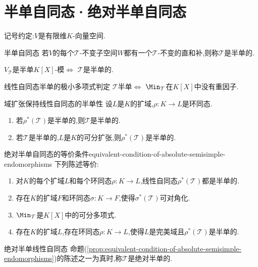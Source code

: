 \section{半单自同态·绝对半单自同态}

记号约定:$V$是有限维$K$-向量空间.

\begin{definition}{半单自同态}{}
	若$V$的每个$\mathcal{T}$-不变子空间$W$都有一个$\mathcal{T}$-不变的直和补,则称$\mathcal{T}$是半单的.
\end{definition}

\begin{remark}{}{}
	$V_{\mathcal{T}}$是半单$K[X]$-模$\iff$ $\mathcal{T}$是半单的.
\end{remark}

\begin{proposition}{线性自同态半单的极小多项式判定}{}
	$\mathcal{T}$半单$\iff$ $\Min_{\mathcal{T}}$在$K\left[X\right]$中没有重因子.
\end{proposition}

\begin{corollary}{域扩张保持线性自同态的半单性}{}
	设$L$是$K$的扩域,$\rho:K\to L$是环同态.
	\begin{enumerate}
		\item 若$\rho^{\ast}\left(\mathcal{T}\right)$是半单的,则$\mathcal{T}$是半单的.
		\item 若$\mathcal{T}$是半单的,$L$是$K$的可分扩张,则$\rho^{\ast}\left(\mathcal{T}\right)$是半单的.
	\end{enumerate}
\end{corollary}

\begin{proposition}{绝对半单自同态的等价条件}{equivalent-condition-of-absolute-semisimple-endomorphisms}
	下列陈述等价:
	\begin{enumerate}
		\item 对$K$的每个扩域$L$和每个环同态$\rho:K\to L$,线性自同态$\rho^{\ast}\left(\mathcal{T}\right)$都是半单的.
		\item 存在$K$的扩域$F$和环同态$\sigma:K\to F$,使得$\sigma^{\ast}\left(\mathcal{T}\right)$可对角化.
		\item $\Min_{\mathcal{T}}$是$K[X]$中的可分多项式.
		\item 存在$K$的扩域$L$,存在环同态$\rho:K\to L$,使得$L$是完美域且$\rho^{\ast}\left(\mathcal{T}\right)$是半单的.
	\end{enumerate}
\end{proposition}

\begin{definition}{绝对半单线性自同态}{}
	命题(\ref{prop:equivalent-condition-of-absolute-semisimple-endomorphisms})的陈述之一为真时,称$\mathcal{T}$是绝对半单的.
\end{definition}

